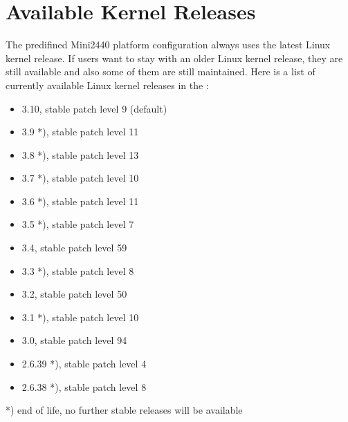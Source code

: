 %
%
%
%
%
%

\newcommand{\perCpuName}{S3C2440}
\newcommand{\curKernelRev}{3.10}

\section{Available Kernel Releases}	\label{sec:kernelreleases}

The predifined Mini2440 platform configuration always uses the latest Linux
kernel release. If users want to stay with an older Linux kernel release,
they are still available and also some of them are still maintained. Here is a
list of currently available Linux kernel releases in the \ptxdistBSPName{}:

\begin{itemize}
	\item \curKernelRev{}, stable patch level 9 (default)
	\item 3.9 *), stable patch level 11
	\item 3.8 *), stable patch level 13
	\item 3.7 *), stable patch level 10
	\item 3.6 *), stable patch level 11
	\item 3.5 *), stable patch level 7
	\item 3.4, stable patch level 59
	\item 3.3 *), stable patch level 8
	\item 3.2, stable patch level 50
	\item 3.1 *), stable patch level 10
	\item 3.0, stable patch level 94
	\item 2.6.39 *), stable patch level 4
	\item 2.6.38 *), stable patch level 8
\end{itemize}
*) end of life, no further stable releases will be available

